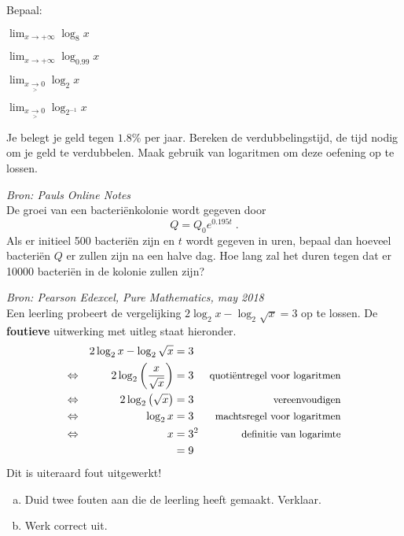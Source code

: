 \documentclass[12pt,twoside,a4paper]{article}
\begin{document}
\begin{oefening}
Bepaal:
\begin{exlist}{2}
  \item $\displaystyle\lim_{x\to +\infty}\log_8 x$
  \item $\displaystyle\lim_{x\to +\infty}\log_{0.99} x$
  \item $\displaystyle\lim_{x\underset{>}{\to} 0}\log_2 x$
  \item $\displaystyle\lim_{x\underset{>}{\to} 0}\log_{2^{-1}} x$
\end{exlist}
\end{oefening}

\begin{oefening}
Je belegt je geld tegen $1.8 \%$ per jaar. Bereken de verdubbelingstijd, de tijd nodig om je geld te verdubbelen. Maak gebruik van logaritmen om deze oefening op te lossen.
\end{oefening}

\begin{oefening} {\em Bron: Pauls Online Notes}\\
De groei van een bacteriënkolonie wordt gegeven door
$$Q=Q_0e^{0.195t}\;.$$
Als er initieel 500 bacteriën zijn en $t$ wordt gegeven in uren, bepaal dan hoeveel bacteriën $Q$ er zullen zijn na een halve dag. Hoe lang zal het duren tegen dat er 10000 bacteriën in de kolonie zullen zijn?
\end{oefening}

\begin{oefening}{\em Bron: Pearson Edexcel, Pure Mathematics, may 2018}                                         \\
  Een leerling probeert de vergelijking $2 \log_2 x - \log_2 \sqrt{x} = 3$ op te lossen. De {\bf foutieve} uitwerking met uitleg staat hieronder.
  \begin{align*}
         &  & 2 \log_2 x - \log_2 \sqrt{x}                & = 3                                                 \\
    \Leftrightarrow &  & 2 \log_2 \left( \dfrac{x}{\sqrt{x}} \right) & = 3   & \text{\small quotiëntregel voor logaritmen} \\
    \Leftrightarrow &  & 2 \log_2 \left( \sqrt{x} \right)            & = 3   & \text{\small vereenvoudigen}                \\
    \Leftrightarrow &  & \log_2 x                                    & = 3   & \text{\small machtsregel voor logaritmen}   \\
    \Leftrightarrow &  & x                                           & = 3^2 & \text{\small definitie van logarimte}       \\
         &  &                                             & = 9
  \end{align*}
  Dit is uiteraard fout uitgewerkt!
  \begin{enumerate}[(a)]
  \item Duid twee fouten aan die de leerling heeft gemaakt. Verklaar.
  \item Werk correct uit.
  \end{enumerate}
\end{oefening}
\end{document}
